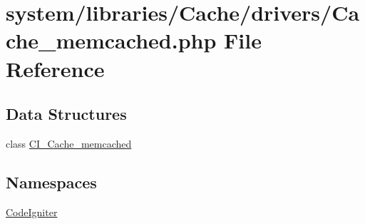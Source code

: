 \hypertarget{_cache__memcached_8php}{\section{system/libraries/\-Cache/drivers/\-Cache\-\_\-memcached.php File Reference}
\label{_cache__memcached_8php}
}
\subsection*{Data Structures}
\begin{DoxyCompactItemize}
\item 
class \hyperlink{class_c_i___cache__memcached}{C\-I\-\_\-\-Cache\-\_\-memcached}
\end{DoxyCompactItemize}
\subsection*{Namespaces}
\begin{DoxyCompactItemize}
\item 
\hyperlink{namespace_code_igniter}{Code\-Igniter}
\end{DoxyCompactItemize}

